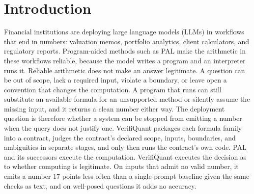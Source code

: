 \documentclass[sigconf]{acmart}
\begin{document}
\maketitle

\setlength{\abovedisplayskip}{5pt plus 2pt minus 2pt}
\setlength{\belowdisplayskip}{5pt plus 2pt minus 2pt}
\setlength{\abovedisplayshortskip}{2pt plus 2pt}
\setlength{\belowdisplayshortskip}{4pt plus 2pt minus 2pt}

\section{Introduction}
Financial institutions are deploying large language models (LLMs) in workflows that end in numbers: valuation memos, portfolio analytics, client calculators, and regulatory reports. Program-aided methods such as PAL \cite{gao2023pal} make the arithmetic in these workflows reliable, because the model writes a program and an interpreter runs it. Reliable arithmetic does not make an answer legitimate. A question can be out of scope, lack a required input, violate a boundary, or leave open a convention that changes the computation. A program that runs can still substitute an available formula for an unsupported method or silently assume the missing input, and it returns a clean number either way. The deployment question is therefore whether a system can be stopped from emitting a number when the query does not justify one. VerifiQuant packages each formula family into a contract, judges the contract's declared scope, inputs, boundaries, and ambiguities in separate stages, and only then runs the contract's own code. PAL and its successors execute the computation. VerifiQuant executes the decision as to whether computing is legitimate. On inputs that admit no valid number, it emits a number 17 points less often than a single-prompt baseline given the same checks as text, and on well-posed questions it adds no accuracy.
\end{document}
